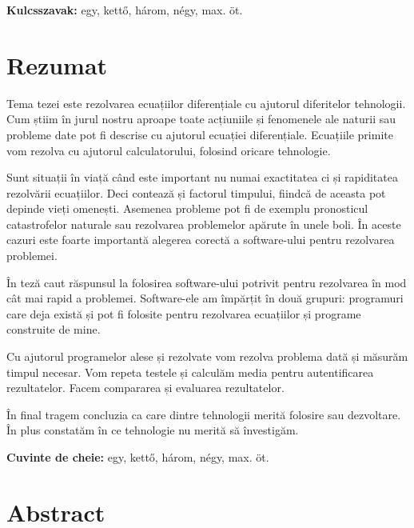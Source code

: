 \noindent \textbf{Kulcsszavak:} egy, kett\H o, h\'arom, n\'egy, max. \"ot.
\vfill
{}

\chapter*{Rezumat}

Tema tezei este rezolvarea ecuațiilor diferențiale cu ajutorul diferitelor tehnologii. Cum știim în jurul nostru aproape toate acțiuniile și fenomenele ale naturii sau probleme date pot fi descrise cu ajutorul ecuației diferențiale. Ecuațiile primite vom rezolva cu ajutorul calculatorului, folosind oricare tehnologie.

Sunt situații în viață când este important nu numai exactitatea ci și rapiditatea rezolvării ecuațiilor. Deci contează și factorul timpului, fiindcă de aceasta pot depinde vieți omenești. Asemenea probleme pot fi de exemplu pronosticul catastrofelor naturale sau rezolvarea problemelor apărute în unele boli. În aceste cazuri este foarte importantă alegerea corectă a software-ului pentru rezolvarea problemei.

În teză caut răspunsul la folosirea software-ului potrivit pentru rezolvarea în mod cât mai rapid a problemei. Software-ele am împărțit în două grupuri: programuri care deja există și pot fi folosite pentru rezolvarea ecuațiilor și programe construite de mine.

Cu ajutorul programelor alese și rezolvate vom rezolva problema dată și măsurăm timpul necesar. Vom repeta testele și calculăm media pentru autentificarea rezultatelor. Facem compararea și evaluarea rezultatelor.

În final tragem concluzia ca care dintre tehnologii merită folosire sau dezvoltare. În plus constatăm în ce tehnologie nu merită să învestigăm.
\vspace*{2cm}


\noindent \textbf{Cuvinte de cheie:} egy, kett\H o, h\'arom, n\'egy, max. \"ot.

\vfill
{}

\chapter*{Abstract}

